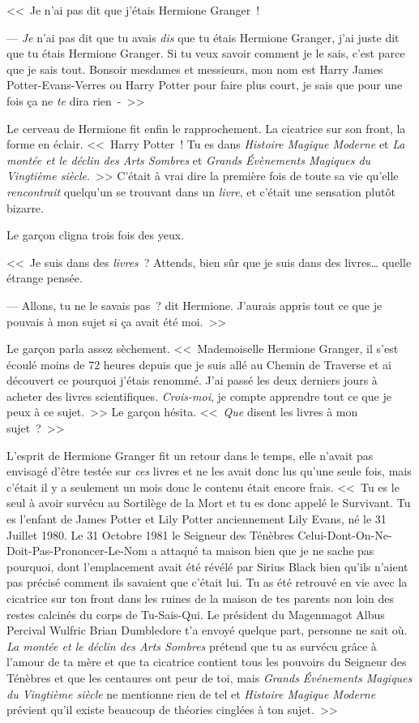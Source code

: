 <<~Je n'ai pas dit que j'étais Hermione Granger~!

--- \emph{Je} n'ai pas dit que tu avais \emph{dis} que tu étais Hermione Granger, j'ai juste dit que tu étais Hermione Granger. Si tu veux savoir comment je le sais, c'est parce que je sais tout. Bonsoir mesdames et messieurs, mon nom est Harry James Potter-Evans-Verres ou Harry Potter pour faire plus court, je sais que pour une fois ça ne \emph{te} dira rien~-~>>

Le cerveau de Hermione fit enfin le rapprochement. La cicatrice sur son front, la forme en éclair. <<~Harry Potter~! Tu es dans \emph{Histoire Magique Moderne} et \emph{La montée et le déclin des Arts Sombres} et \emph{Grands Évènements Magiques du Vingtième siècle}.~>> C'était à vrai dire la première fois de toute sa vie qu'elle \emph{rencontrait} quelqu'un se trouvant dans un \emph{livre}, et c'était une sensation plutôt bizarre.

Le garçon cligna trois fois des yeux.

<<~Je suis dans des \emph{livres}~? Attends, bien sûr que je suis dans des livres… quelle étrange pensée.

--- Allons, tu ne le savais pas~? dit Hermione. J'aurais appris tout ce que je pouvais à mon sujet si ça avait été moi.~>>

Le garçon parla assez sèchement. <<~Mademoiselle Hermione Granger, il s'est écoulé moins de 72 heures depuis que je suis allé au Chemin de Traverse et ai découvert ce pourquoi j'étais renommé. J'ai passé les deux derniers jours à acheter des livres scientifiques. \emph{Crois-moi}, je compte apprendre tout ce que je peux à ce sujet.~>> Le garçon hésita. <<~\emph{Que} disent les livres à mon sujet~?~>>

L'esprit de Hermione Granger fit un retour dans le temps, elle n'avait pas envisagé d'être testée sur \emph{ces} livres et ne les avait donc lus qu'une seule fois, mais c'était il y a seulement un mois donc le contenu était encore frais. <<~Tu es le seul à avoir survécu au Sortilège de la Mort et tu es donc appelé le Survivant. Tu es l'enfant de James Potter et Lily Potter anciennement Lily Evans, né le 31 Juillet 1980. Le 31 Octobre 1981 le Seigneur des Ténèbres Celui-Dont-On-Ne-Doit-Pas-Prononcer-Le-Nom a attaqué ta maison bien que je ne sache pas pourquoi, dont l'emplacement avait été révélé par Sirius Black bien qu'ils n'aient pas précisé comment ils savaient que c'était lui. Tu as été retrouvé en vie avec la cicatrice sur ton front dans les ruines de la maison de tes parents non loin des restes calcinés du corps de Tu-Sais-Qui. Le président du Magenmagot Albus Percival Wulfric Brian Dumbledore t'a envoyé quelque part, personne ne sait où. \emph{La montée et le déclin des Arts Sombres} prétend que tu as survécu grâce à l'amour de ta mère et que ta cicatrice contient tous les pouvoirs du Seigneur des Ténèbres et que les centaures ont peur de toi, mais \emph{Grands Événements Magiques du Vingtième siècle} ne mentionne rien de tel et \emph{Histoire Magique Moderne} prévient qu'il existe beaucoup de théories cinglées à ton sujet.~>>

